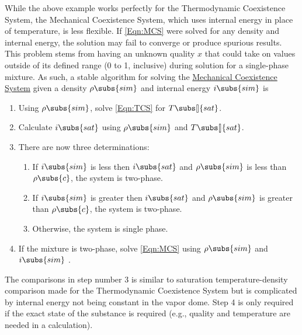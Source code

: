 \documentclass[12pt]{WisconsinThesis}
\newcommand{\Tsat}{\ensuremath{T\subs[\!\!\:]{sat}}\xspace}
\newcommand{\TCS}    {Thermodynamic Coexistence System\xspace}
\newcommand{\MCS}    {Mechanical Coexistence System\xspace}
\newcommand{\MCSRef} {\hyperref[Eqn:MCS]{\MCS}\xspace}
\begin{document}
While the above example works perfectly for the \TCS, the \MCS, which uses internal energy in place of temperature, is less flexible.
If \cref{Eqn:MCS} were solved for any density and internal energy, the solution may fail to converge or produce spurious results.
This problem stems from having an unknown quality $x$ that could take on values outside of its defined range (0 to 1, inclusive) during solution for a single-phase mixture.
As such, a stable algorithm for solving the \MCSRef given a density $\rho\subs{sim}$ and internal energy $i\subs{sim}$ is
\begin{enumerate}
    \item{Using $\rho\subs{sim}$, solve \cref{Eqn:TCS} for \Tsat.}
    \item{Calculate $i\subs{sat}$ using $\rho\subs{sim}$ and \Tsat.}
    \item{There are now three determinations:
    \begin{enumerate}
        \item{If $i\subs{sim}$ is less    then $i\subs{sat}$ and $\rho\subs{sim}$ is less    than $\rho\subs{c}$, the system is two-phase.}
        \item{If $i\subs{sim}$ is greater then $i\subs{sat}$ and $\rho\subs{sim}$ is greater than $\rho\subs{c}$, the system is two-phase.}
        \item{Otherwise, the system is single phase.}
    \end{enumerate}
    }
    \item{If the mixture is two-phase, solve \cref{Eqn:MCS} using $\rho\subs{sim}$ and $i\subs{sim}$ .}
\end{enumerate}
The comparisons in step number 3 is similar to saturation temperature-density comparison made for the \TCS but is complicated by internal energy not being constant in the vapor dome.
Step 4 is only required if the exact state of the substance is required (e.g., quality and temperature are needed in a calculation).
\end{document}
